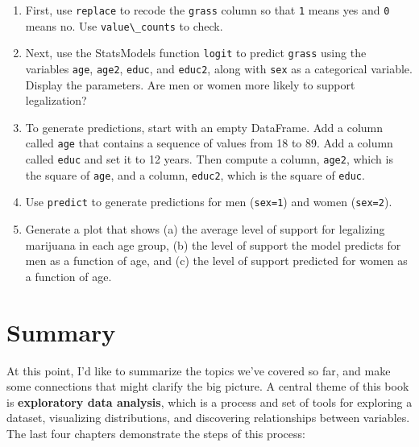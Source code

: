 \begin{enumerate}
\def\labelenumi{\arabic{enumi}.}
\item
  First, use \passthrough{\lstinline!replace!} to recode the
  \passthrough{\lstinline!grass!} column so that
  \passthrough{\lstinline!1!} means yes and \passthrough{\lstinline!0!}
  means no. Use \passthrough{\lstinline!value\_counts!} to check.
\item
  Next, use the StatsModels function \passthrough{\lstinline!logit!} to
  predict \passthrough{\lstinline!grass!} using the variables
  \passthrough{\lstinline!age!}, \passthrough{\lstinline!age2!},
  \passthrough{\lstinline!educ!}, and \passthrough{\lstinline!educ2!},
  along with \passthrough{\lstinline!sex!} as a categorical variable.
  Display the parameters. Are men or women more likely to support
  legalization?
\item
  To generate predictions, start with an empty DataFrame. Add a column
  called \passthrough{\lstinline!age!} that contains a sequence of
  values from 18 to 89. Add a column called
  \passthrough{\lstinline!educ!} and set it to 12 years. Then compute a
  column, \passthrough{\lstinline!age2!}, which is the square of
  \passthrough{\lstinline!age!}, and a column,
  \passthrough{\lstinline!educ2!}, which is the square of
  \passthrough{\lstinline!educ!}.
\item
  Use \passthrough{\lstinline!predict!} to generate predictions for men
  (\passthrough{\lstinline!sex=1!}) and women
  (\passthrough{\lstinline!sex=2!}).
\item
  Generate a plot that shows (a) the average level of support for
  legalizing marijuana in each age group, (b) the level of support the
  model predicts for men as a function of age, and (c) the level of
  support predicted for women as a function of age.
\end{enumerate}

\section{Summary}\label{summary}

At this point, I'd like to summarize the topics we've covered so far,
and make some connections that might clarify the big picture. A central
theme of this book is \textbf{exploratory data analysis}, which is a
process and set of tools for exploring a dataset, visualizing
distributions, and discovering relationships between variables. The last
four chapters demonstrate the steps of this process:

